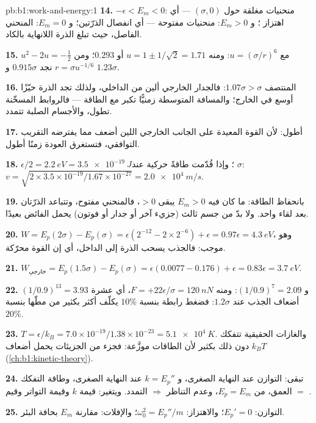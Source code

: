 \begin{solution}{pb:b1:work-and-energy:1}
\textbf{14.} $-\epsilon < E_m < 0$: منحنيات مغلقة حول $(\sigma, 0)$ ---
أي اهتزاز ؛ و $E_m > 0$: منحنيات مفتوحة --- أي انفصال الذرّتين؛
و $E_m = 0$: المنحني الفاصل، حيث تبلغ الذرة اللانهاية بالكاد.

\textbf{15.} $u^2 - 2u = -\tfrac12$ مع $u = (\sigma/r)^6$: ومنه $u = 1 \pm 1/\sqrt2
= 1.71$ أو $0.293$؛ ومن $r = \sigma u^{-1/6}$ نجد $0.915\sigma$ و $1.23\sigma$.

\textbf{16.} المنتصف $1.07\sigma > \sigma$: فالجدار الخارجي ألين من
الداخلي، ولذلك تجد الذرة حيّزًا أوسع في الخارج؛ والمسافة المتوسطة
زمنيًّا تكبر مع الطاقة --- فالروابط المسخّنة تطول، والأجسام الصلبة تتمدد.

\textbf{17.} أطول: لأن القوة المعيدة على الجانب الخارجي اللين
أضعف مما يفترضه التقريب التوافقي، فتستغرق العودة
زمنًا أطول.

\textbf{18.} $\epsilon/2 = \qty{2.2}{eV} = \qty{3.5e-19}{J}$؛ وإذا قُدّمت طاقةً
حركية عند $\sigma$: $v = \sqrt{2 \times 3.5\times10^{-19}/1.67\times10^{-27}}
= \qty{2.0e4}{m/s}$.

\textbf{19.} بانحفاظ الطاقة: ما كان فيه $E_m > 0$ يبقى $> 0$، فالمنحني
مفتوح، وتتباعد الذرّتان بعد لقاء واحد. ولا بدّ من جسم ثالث
(جزيء آخر أو جدار أو فوتون) يحمل الفائض بعيدًا.

\textbf{20.} $W = E_p(2\sigma) - E_p(\sigma) = \epsilon(2^{-12} - 2 \times 2^{-6})
+ \epsilon = 0.97\epsilon = \qty{4.3}{eV}$، وهو موجب: فالجذب يسحب
الذرة إلى الداخل، أي إن القوة محرّكة.

\textbf{21.} $W_{\text{خارجي}} = E_p(1.5\sigma) - E_p(\sigma) = \epsilon(0.0077 -
0.176) + \epsilon = 0.83\epsilon = \qty{3.7}{eV}$.

\textbf{22.} $(1/0.9)^{13} = 3.93$ و $(1/0.9)^7 = 2.09$: ومنه $F = +22\epsilon/\sigma
= \qty{+120}{nN}$، أي عشرة أضعاف الجذب عند $1.2\sigma$: فضغط
رابطة بنسبة $10\%$ يكلّف أكثر بكثير من مطّها بنسبة $20\%$.

\textbf{23.} $T = \epsilon/k_B = 7.0\times10^{-19}/1.38\times10^{-23} =
\qty{5.1e4}{K}$. والغازات الحقيقية تتفكك دون ذلك بكثير لأن الطاقات
موزَّعة: فجزء من الجزيئات يحمل أضعاف $k_BT$
(\cref{ch:b1:kinetic-theory}).

\textbf{24.} تبقى: التوازن عند النهاية الصغرى، و $k = E_p''$ عند
النهاية الصغرى، وطاقة التفكك $=$ العمق،  من $E_p = E_m$،
وعدم التناظر $\Rightarrow$ التمدد. ويتغير: قيمة $k$ وقيمة
التواتر وقيم .

\textbf{25.} التوازن: $E_p' = 0$؛ والاهتزاز: $\omega_0^2 = E_p''/m$؛
والإفلات: مقارنة $E_m$ بحافة البئر.
\end{solution}
